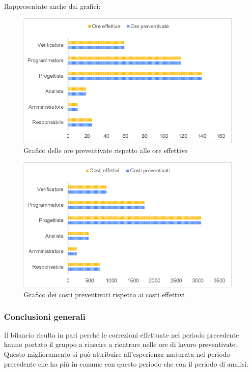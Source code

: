Rappresentate anche dai grafici:
\begin{figure} [H]
	\includegraphics[width=\linewidth]{./img/Grafici/29.png}
	\caption{Grafico delle ore preventivate rispetto alle ore effettive}
\end{figure}

\begin{figure} [H]
	\includegraphics[width=\linewidth]{./img/Grafici/30.png}
	\caption{Grafico dei costi preventivati rispetto ai costi effettivi}
\end{figure}


\subsubsection{Conclusioni generali}
Il bilancio risulta in pari perché le correzioni effettuate nel periodo precedente hanno portato il gruppo a riuscire a rientrare nelle ore di lavoro preventivate. Questo miglioramento si può attribuire all'esperienza maturata nel periodo precedente che ha più in comune con questo periodo che con il periodo di analisi.

